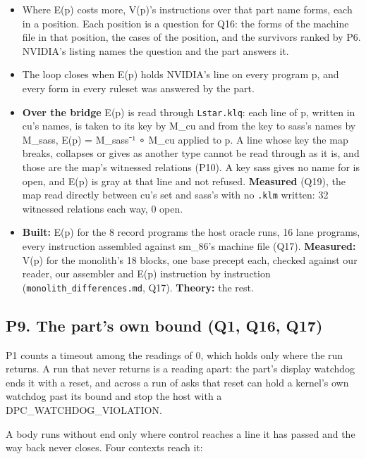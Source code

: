 \begin{itemize}
\item Where E(p) costs more, V(p)'s instructions over that part name forms, each in a position. Each position is a question for Q16: the forms of the machine file in that position, the cases of the position, and the survivors ranked by P6. NVIDIA's listing names the question and the part answers it.
\item The loop closes when E(p) holds NVIDIA's line on every program p, and every form in every ruleset was answered by the part.
\item \textbf{Over the bridge} E(p) is read through \texttt{Lstar.\allowbreak{}klq}: each line of p, written in cu's names, is taken to its key by M\_\allowbreak{}cu and from the key to sass's names by M\_\allowbreak{}sass, E(p) = M\_\allowbreak{}sass⁻¹ ∘ M\_\allowbreak{}cu applied to p. A line whose key the map breaks, collapses or gives as another type cannot be read through as it is, and those are the map's witnessed relations (P10). A key sass gives no name for is open, and E(p) is gray at that line and not refused. \textbf{Measured} (Q19), the map read directly between cu's set and sass's with no \texttt{.\allowbreak{}klm} written: 32 witnessed relations each way, 0 open.
\item \textbf{Built:} E(p) for the 8 record programs the host oracle runs, 16 lane programs, every instruction assembled against sm\_\allowbreak{}86's machine file (Q17). \textbf{Measured:} V(p) for the monolith's 18 blocks, one base precept each, checked against our reader, our assembler and E(p) instruction by instruction (\texttt{monolith\_\allowbreak{}differences.\allowbreak{}md}, Q17). \textbf{Theory:} the rest.
\end{itemize}

\subsection{\texorpdfstring{P9. The part's own bound (Q1, Q16, Q17)}{P9. The part's own bound (Q1, Q16, Q17)}}

P1 counts a timeout among the readings of 0, which holds only where the run returns. A run that never returns is a reading apart: the part's display watchdog ends it with a reset, and across a run of asks that reset can hold a kernel's own watchdog past its bound and stop the host with a DPC\_\allowbreak{}WATCHDOG\_\allowbreak{}VIOLATION.

A body runs without end only where control reaches a line it has passed and the way back never closes. Four contexts reach it:

